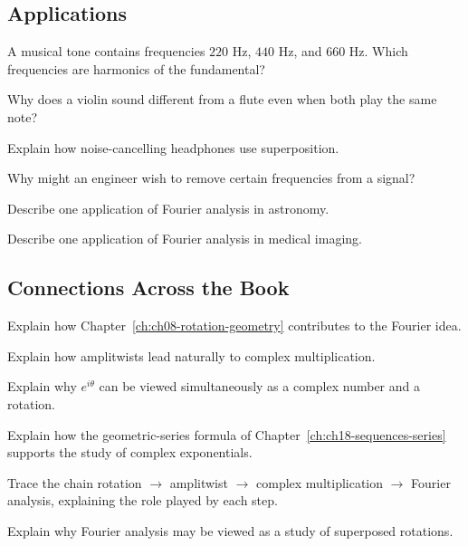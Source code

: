 \subsection*{Applications}
\begin{exercise}
A musical tone contains frequencies $220$ Hz, $440$ Hz, and $660$ Hz.
Which frequencies are harmonics of the fundamental?
\end{exercise}
\begin{exercise}
Why does a violin sound different from a flute even when both play the
same note?
\end{exercise}
\begin{exercise}
Explain how noise-cancelling headphones use superposition.
\end{exercise}
\begin{exercise}
Why might an engineer wish to remove certain frequencies from a signal?
\end{exercise}
\begin{exercise}
Describe one application of Fourier analysis in astronomy.
\end{exercise}
\begin{exercise}
Describe one application of Fourier analysis in medical imaging.
\end{exercise}

\subsection*{Connections Across the Book}
\begin{exercise}
Explain how Chapter~\ref{ch:ch08-rotation-geometry} contributes to the
Fourier idea.
\end{exercise}
\begin{exercise}
Explain how amplitwists lead naturally to complex multiplication.
\end{exercise}
\begin{exercise}
Explain why $e^{i\theta}$ can be viewed simultaneously as a complex
number and a rotation.
\end{exercise}
\begin{exercise}
Explain how the geometric-series formula of
Chapter~\ref{ch:ch18-sequences-series} supports the study of complex
exponentials.
\end{exercise}
\begin{exercise}
Trace the chain rotation $\to$ amplitwist $\to$ complex multiplication
$\to$ Fourier analysis, explaining the role played by each step.
\end{exercise}
\begin{exercise}
Explain why Fourier analysis may be viewed as a study of superposed
rotations.
\end{exercise}

